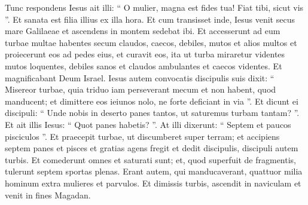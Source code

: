 \begin{biblechapter}
\begin{biblechapter}
\begin{biblechapter}
\begin{biblechapter}
\begin{biblechapter}
\begin{biblechapter}
\begin{biblechapter}
\begin{biblechapter}
\begin{biblechapter}
\begin{biblechapter}
\begin{biblechapter}
\begin{biblechapter}
\begin{biblechapter}
\begin{biblechapter}
\begin{biblechapter}
\verse Tunc respondens Iesus ait illi: “ O mulier, magna est fides tua! Fiat tibi, sicut vis ”. Et sanata est filia illius ex illa hora.
 \verse Et cum transisset inde, Iesus venit secus mare Galilaeae et ascendens in montem sedebat ibi. 
\verse Et accesserunt ad eum turbae multae habentes secum claudos, caecos, debiles, mutos et alios multos et proiecerunt eos ad pedes eius, et curavit eos, 
\verse ita ut turba miraretur videntes mutos loquentes, debiles sanos et claudos ambulantes et caecos videntes. Et magnificabant Deum Israel. 
\verse Iesus autem convocatis discipulis suis dixit: “ Misereor turbae, quia triduo iam perseverant mecum et non habent, quod manducent; et dimittere eos ieiunos nolo, ne forte deficiant in via ”. 
\verse Et dicunt ei discipuli: “ Unde nobis in deserto panes tantos, ut saturemus turbam tantam? ”. 
\verse Et ait illis Iesus: “ Quot panes habetis? ”. At illi dixerunt: “ Septem et paucos pisciculos ”. 
\verse Et praecepit turbae, ut discumberet super terram; 
\verse et accipiens septem panes et pisces et gratias agens fregit et dedit discipulis, discipuli autem turbis. 
\verse Et comederunt omnes et saturati sunt; et, quod superfuit de fragmentis, tulerunt septem sportas plenas. 
\verse Erant autem, qui manducaverant, quattuor milia hominum extra mulieres et parvulos. 
\verse Et dimissis turbis, ascendit in naviculam et venit in fines Magadan.
 

\end{biblechapter}
\end{biblechapter}
\end{biblechapter}
\end{biblechapter}
\end{biblechapter}
\end{biblechapter}
\end{biblechapter}
\end{biblechapter}
\end{biblechapter}
\end{biblechapter}
\end{biblechapter}
\end{biblechapter}
\end{biblechapter}
\end{biblechapter}
\end{biblechapter}
